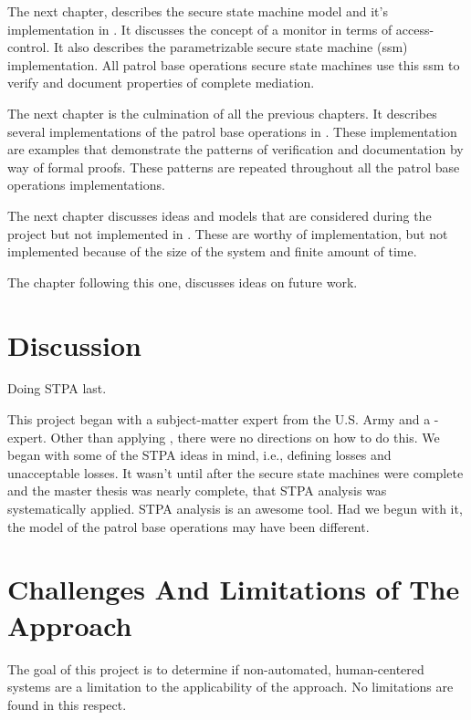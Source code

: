 \documentclass[../../main/main.tex]{subfiles}
\begin{document}
The next chapter, describes the secure state machine model and it's implementation in .  It discusses the concept of a monitor in terms of access-control.  It also describes the parametrizable secure state machine (ssm)   implementation. All patrol base operations secure state machines use this ssm to verify and document properties of complete mediation.

The next chapter is the culmination of all the previous chapters. It describes several implementations of the patrol base operations in .  These implementation are examples that demonstrate the patterns of verification and documentation by way of formal proofs.  These patterns are repeated throughout all the patrol base operations implementations.

The next chapter discusses ideas and models that are considered during the project but not implemented in .  These are worthy of implementation, but not implemented because of the size of the system and finite amount of time.  

The chapter following this one, discusses ideas on future work.  

\section{Discussion}\label{sec:discussion}
Doing STPA last.

This project began with a subject-matter expert from the U.S. Army and a -expert.  Other than applying , there were no directions on how to do this.  We began with some of the STPA ideas in mind, i.e., defining losses and unacceptable losses.  It wasn't until after the secure state machines were complete and the master thesis was nearly complete, that STPA analysis was systematically applied.  STPA analysis is an awesome tool.  Had we begun with it, the model of the patrol base operations may have been different.

\section{Challenges And Limitations of The Approach}\label{missionaccomplished}
The goal of this project is to determine if non-automated, human-centered systems are a limitation to the applicability of the  approach.  No limitations are found in this respect.  
\end{document}
